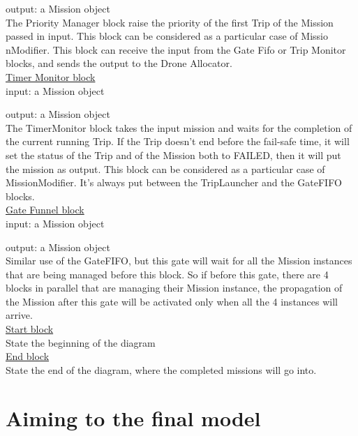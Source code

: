 output: a Mission object
\\

The Priority Manager block raise the priority of the first Trip of the Mission passed in input.
This block can be considered as a particular case of Missio nModifier. 
This block can receive the input from the Gate Fifo or Trip Monitor blocks, and sends the output to the Drone Allocator.
\\

\underline{Timer Monitor block}
\\

input: a Mission object

output: a Mission object
\\

The TimerMonitor block takes the input mission and waits for the completion of the current running Trip. If the Trip doesn't end before the fail-safe time, it will set the status of the Trip and of the Mission both to FAILED, then it will put the mission as output.
This block can be considered as a particular case of MissionModifier.
It's always put between the TripLauncher and the GateFIFO blocks.
\\

\underline{Gate Funnel block}
\\

input: a Mission object

output: a Mission object
\\

Similar use of the GateFIFO, but this gate will wait for all the Mission instances that are being managed before this block. So if before this gate, there are 4 blocks in parallel that are managing their Mission instance, the propagation of the Mission after this gate will be activated only when all the 4 instances will arrive.
\\

\underline{Start block}
\\
State the beginning of the diagram
\\

\underline{End block}
\\
State the end of the diagram, where the completed missions will go into.
\\

\section{Aiming to the final model}

